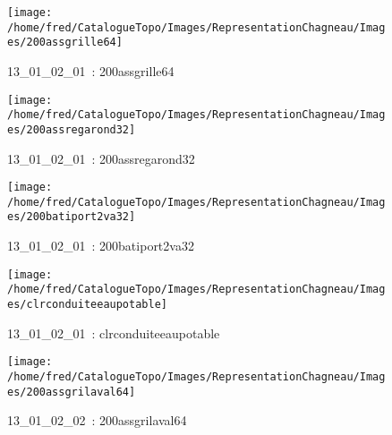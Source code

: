 \documentclass[12pt,titlepage]{book}
\begin{document}
\begin{figure}[h!]
  \hfill         %
  \begin{minipage}[t]{3cm}
    \begin{center}
      \texttt{[image: /home/fred/CatalogueTopo/Images/RepresentationChagneau/Images/200assgrille64]}
      \caption[~13\_01\_02\_01]{\small{13\_01\_02\_01~:} \tiny{200assgrille64}}\label{200assgrille64}
    \end{center}
  \end{minipage}
  \begin{minipage}[t]{3cm}
    \begin{center}
      \texttt{[image: /home/fred/CatalogueTopo/Images/RepresentationChagneau/Images/200assregarond32]}
      \caption[~13\_01\_02\_01]{\small{13\_01\_02\_01~:} \tiny{200assregarond32}}\label{200assregarond32}
    \end{center}
  \end{minipage}
  \begin{minipage}[t]{3cm}
    \begin{center}
      \texttt{[image: /home/fred/CatalogueTopo/Images/RepresentationChagneau/Images/200batiport2va32]}
      \caption[~13\_01\_02\_01]{\small{13\_01\_02\_01~:} \tiny{200batiport2va32}}\label{200batiport2va32}
    \end{center}
  \end{minipage}
  \begin{minipage}[t]{3cm}
    \begin{center}
      \texttt{[image: /home/fred/CatalogueTopo/Images/RepresentationChagneau/Images/clrconduiteeaupotable]}
      \caption[~13\_01\_02\_01]{\small{13\_01\_02\_01~:} \tiny{clrconduiteeaupotable}}\label{clrconduiteeaupotable}
    \end{center}
  \end{minipage}
  \begin{minipage}[t]{3cm}
    \begin{center}
      \texttt{[image: /home/fred/CatalogueTopo/Images/RepresentationChagneau/Images/200assgrilaval64]}
      \caption[~13\_01\_02\_02]{\small{13\_01\_02\_02~:} \tiny{200assgrilaval64}}\label{200assgrilaval64}
    \end{center}
  \end{minipage}

\end{figure}
\end{document}
